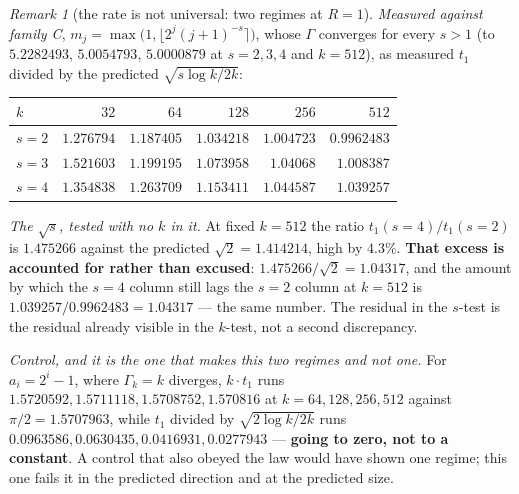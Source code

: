 \documentclass[11pt,a4paper]{article}
\theoremstyle{plain}
\theoremstyle{definition}
\theoremstyle{remark}
\newtheorem{remark}[theorem]{Remark}
\begin{document}
\begin{remark}[the rate is not universal: two regimes at $R=1$]
\emph{Measured against family C}, $m_j=\max\bigl(1,\lfloor2^{j}(j+1)^{-s}\rceil\bigr)$, whose
$\Gamma$ converges for every $s>1$ (to $5.2282493$, $5.0054793$, $5.0000879$ at $s=2,3,4$ and
$k=512$), as measured $t_1$ divided by the predicted $\sqrt{s\log k/2k}$:
\begin{center}
\begin{tabular}{lrrrrr}
\hline
$k$ & $32$ & $64$ & $128$ & $256$ & $512$\\
\hline
$s=2$ & $1.276794$ & $1.187405$ & $1.034218$ & $1.004723$ & $0.9962483$\\
$s=3$ & $1.521603$ & $1.199195$ & $1.073958$ & $1.04068$ & $1.008387$\\
$s=4$ & $1.354838$ & $1.263709$ & $1.153411$ & $1.044587$ & $1.039257$\\
\hline
\end{tabular}
\end{center}

\emph{The $\sqrt{s}$, tested with no $k$ in it.} At fixed $k=512$ the ratio
$t_1(s{=}4)/t_1(s{=}2)$ is $1.475266$ against the predicted $\sqrt2=1.414214$, high by
$4.3\%$. \textbf{That excess is accounted for rather than excused}: $1.475266/\sqrt2=1.04317$,
and the amount by which the $s=4$ column still lags the $s=2$ column at $k=512$ is
$1.039257/0.9962483=1.04317$ --- the same number. The residual in the $s$-test is the residual
already visible in the $k$-test, not a second discrepancy.

\emph{Control, and it is the one that makes this two regimes and not one.} For $a_i=2^{i}-1$,
where $\Gamma_k=k$ diverges, $k\cdot t_1$ runs $1.5720592, 1.5711118, 1.5708752, 1.570816$ at
$k=64,128,256,512$ against $\pi/2=1.5707963$, while $t_1$ divided by $\sqrt{2\log k/2k}$ runs
$0.0963586, 0.0630435, 0.0416931, 0.0277943$ --- \textbf{going to zero, not to a constant}. A
control that also obeyed the law would have shown one regime; this one fails it in the predicted
direction and at the predicted size.


\end{remark}
\end{document}
